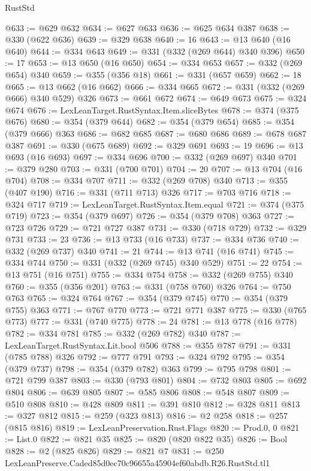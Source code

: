 \begin{lexlean}{RustStd}
\begin{coremodule}
@633 := @629 @632
@634 := @627 @633
@636 := @625 @634 @387
@638 := @330 (@622 @636)
@639 := @329 @638
@640 := 16
@643 := @13 @640 (@16 @640)
@644 := @334 @643
@649 := @331 (@332 (@269 @644) @340 @396)
@650 := 17
@653 := @13 @650 (@16 @650)
@654 := @334 @653
@657 := @332 (@269 @654) @340
@659 := @355 (@356 @18)
@661 := @331 (@657 @659)
@662 := 18
@665 := @13 @662 (@16 @662)
@666 := @334 @665
@672 := @331 (@332 (@269 @666) @340 @529) @326
@673 := @661 @672
@674 := @649 @673
@675 := @324 @674
@676 := LexLeanTarget.RustSyntax.Item.sliceBytes
@678 := @374 (@375 @676)
@680 := @354 (@379 @644)
@682 := @354 (@379 @654)
@685 := @354 (@379 @666) @363
@686 := @682 @685
@687 := @680 @686
@689 := @678 @687 @387
@691 := @330 (@675 @689)
@692 := @329 @691
@693 := 19
@696 := @13 @693 (@16 @693)
@697 := @334 @696
@700 := @332 (@269 @697) @340
@701 := @379 @280
@703 := @331 (@700 @701)
@704 := 20
@707 := @13 @704 (@16 @704)
@708 := @334 @707
@711 := @332 (@269 @708) @340
@713 := @355 (@407 @190)
@716 := @331 (@711 @713) @326
@717 := @703 @716
@718 := @324 @717
@719 := LexLeanTarget.RustSyntax.Item.equal
@721 := @374 (@375 @719)
@723 := @354 (@379 @697)
@726 := @354 (@379 @708) @363
@727 := @723 @726
@729 := @721 @727 @387
@731 := @330 (@718 @729)
@732 := @329 @731
@733 := 23
@736 := @13 @733 (@16 @733)
@737 := @334 @736
@740 := @332 (@269 @737) @340
@741 := 21
@744 := @13 @741 (@16 @741)
@745 := @334 @744
@750 := @331 (@332 (@269 @745) @340 @529)
@751 := 22
@754 := @13 @751 (@16 @751)
@755 := @334 @754
@758 := @332 (@269 @755) @340
@760 := @355 (@356 @201)
@763 := @331 (@758 @760) @326
@764 := @750 @763
@765 := @324 @764
@767 := @354 (@379 @745)
@770 := @354 (@379 @755) @363
@771 := @767 @770
@773 := @721 @771 @387
@775 := @330 (@765 @773)
@777 := @331 (@740 @775)
@778 := 24
@781 := @13 @778 (@16 @778)
@782 := @334 @781
@785 := @332 (@269 @782) @340
@787 := LexLeanTarget.RustSyntax.Lit.bool @506
@788 := @355 @787
@791 := @331 (@785 @788) @326
@792 := @777 @791
@793 := @324 @792
@795 := @354 (@379 @737)
@798 := @354 (@379 @782) @363
@799 := @795 @798
@801 := @721 @799 @387
@803 := @330 (@793 @801)
@804 := @732 @803
@805 := @692 @804
@806 := @639 @805
@807 := @585 @806
@808 := @548 @807
@809 := @510 @808
@810 := @428 @809
@811 := @391 @810
@812 := @328 @811
@813 := @327 @812
@815 := @259 (@323 @813)
@816 := @2 @258
@818 := @257 (@815 @816)
@819 := LexLeanPreservation.Rust.Flags
@820 := Prod.{0, 0}
@821 := List.{0}
@822 := @821 @35
@825 := @820 (@820 @822 @35)
@826 := Bool
@828 := @2 (@825 @826)
@829 := @821 @7
@831 := @250 LexLeanPreserve.Caded85d0ec70c96655a45904ef60abdb.R26.RustStd.tl1

\end{coremodule}
\end{lexlean}
